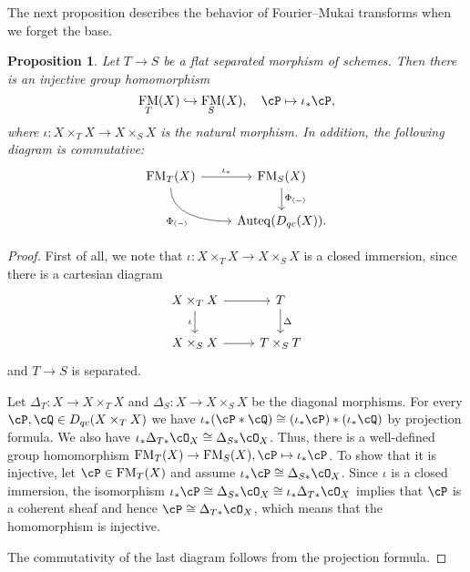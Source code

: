 \documentclass[12pt]{amsart}
\numberwithin{equation}{section}
\theoremstyle{plain}
\newtheorem{proposition}[theorem]{Proposition}
\theoremstyle{definition}
\DeclareMathOperator{\Auteq}{\mathrm{Auteq}}
\DeclareMathOperator{\FM}{\mathrm{FM}}
\begin{document}
The next proposition describes the behavior of Fourier--Mukai transforms when we forget the base.
\begin{proposition}\label{prpo:forget-base}
    Let $T \to S$ be a flat separated morphism of schemes.
    Then there is an injective group homomorphism
    \begin{equation}
        \FM_T(X) \hookrightarrow \FM_S(X), \quad \cP \mapsto \iota_* \cP,
    \end{equation}
    where $\iota \colon X \times_T X \to X \times_S X$ is the natural morphism.
    In addition, the following diagram is commutative:
    \[
        \begin{tikzcd}
            \FM_T(X) \ar[r, "\iota_*"] \ar[rd, out=-90, in=180, "\Phi_{(-)}"'] & \FM_S(X) \ar[d, "\Phi_{(-)}"] \\
            & \Auteq(D_{qc}(X)).
        \end{tikzcd}
    \]
\end{proposition}
\begin{proof}
    First of all, we note that $\iota \colon X \times_T X \to X \times_S X$ is a closed immersion, since there is a cartesian diagram
    \[
        \begin{tikzcd}
            X \times_T X \ar[r] \ar[d, "\iota"'] & T \ar[d, "\Delta"]\\
            X \times_S X \ar[r] & T \times_S T
        \end{tikzcd}
    \]
    and $T \to S$ is separated.


    Let $\Delta_T \colon X \to X \times_T X$ and $\Delta_S \colon X \to X \times_S X$ be the diagonal morphisms.
    For every $\cP, \cQ \in D_{qc}(X \times_T X)$ we have $\iota_*(\cP * \cQ) \cong (\iota_* \cP) * (\iota_* \cQ)$ by projection formula. We also have $\iota_* \Delta_{T*}\cO_X \cong \Delta_{S*}\cO_X$.
    Thus, there is a well-defined group homomorphism  $\FM_T(X) \to \FM_S(X), \cP \mapsto \iota_* \cP$.
    To show that it is injective, let $\cP \in \FM_T(X)$ and assume $\iota_* \cP \cong \Delta_{S*}\cO_X$.
    Since $\iota$ is a closed immersion, the isomorphism $\iota_* \cP \cong \Delta_{S*}\cO_X \cong \iota_*\Delta_{T*}\cO_X$ implies that $\cP$ is a coherent sheaf and hence $\cP \cong \Delta_{T*}\cO_X$, which means that the homomorphism is injective.

    The commutativity of the last diagram follows from the projection formula.
\end{proof}
\end{document}
